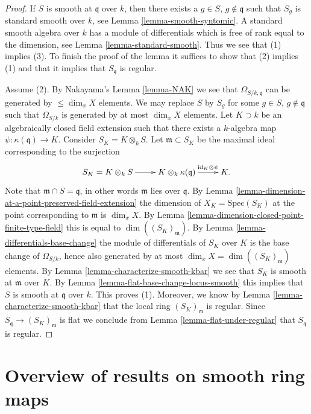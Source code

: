 \begin{proof}
If $S$ is smooth at $\mathfrak q$ over $k$, then there exists
a $g \in S$, $g \not \in \mathfrak q$ such that $S_g$ is
standard smooth over $k$, see Lemma \ref{lemma-smooth-syntomic}.
A standard smooth algebra over $k$ has a module of differentials
which is free of rank equal to the dimension, see
Lemma \ref{lemma-standard-smooth}. Thus we see that
(1) implies (3). To finish the proof of the lemma it
suffices to show that (2) implies (1) and that it implies
that $S_{\mathfrak q}$ is regular.

\medskip\noindent
Assume (2). By Nakayama's Lemma \ref{lemma-NAK} we see that
$\Omega_{S/k, \mathfrak q}$ can be generated by $\leq \dim_x X$ elements.
We may replace $S$ by $S_g$ for some $g \in S$, $g \not \in \mathfrak q$
such that $\Omega_{S/k}$ is generated by at most
$\dim_x X$ elements.
Let $K \supset k$ be an algebraically closed field extension
such that there exists a $k$-algebra map $\psi : \kappa(\mathfrak q) \to K$.
Consider $S_K = K \otimes_k S$. Let $\mathfrak m \subset S_K$
be the maximal ideal corresponding to the surjection
$$
\xymatrix{
S_K = K \otimes_k S \ar[r] &
K \otimes_k \kappa(\mathfrak q)
\ar[r]^-{\text{id}_K \otimes \psi} &
K.
}
$$
Note that $\mathfrak m \cap S = \mathfrak q$, in other words
$\mathfrak m$ lies over $\mathfrak q$.
By Lemma \ref{lemma-dimension-at-a-point-preserved-field-extension}
the dimension of $X_K = \text{Spec}(S_K)$ at the point corresponding
to $\mathfrak m$ is $\dim_x X$. By
Lemma \ref{lemma-dimension-closed-point-finite-type-field}
this is equal to $\dim((S_K)_{\mathfrak m})$.
By Lemma \ref{lemma-differentials-base-change}
the module of differentials of $S_K$ over $K$ is
the base change of $\Omega_{S/k}$, hence also
generated by at most $\dim_x X = \dim((S_K)_{\mathfrak m})$
elements. By Lemma \ref{lemma-characterize-smooth-kbar}
we see that $S_K$ is smooth at $\mathfrak m$ over $K$.
By Lemma \ref{lemma-flat-base-change-locus-smooth} this
implies that $S$ is smooth at $\mathfrak q$ over $k$.
This proves (1). Moreover, we know by
Lemma \ref{lemma-characterize-smooth-kbar}
that the local ring $(S_K)_{\mathfrak m}$ is regular.
Since $S_{\mathfrak q} \to (S_K)_{\mathfrak m}$ is flat we
conclude from Lemma \ref{lemma-flat-under-regular}
that $S_{\mathfrak q}$ is regular.
\end{proof}








\section{Overview of results on smooth ring maps}
\label{section-smooth-overview}

